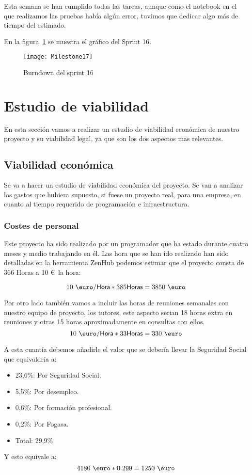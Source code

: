Esta semana se han cumplido todas las tareas, aunque como el notebook en el que realizamos las pruebas había algún error, tuvimos que dedicar algo más de tiempo del estimado.

En la figura~\ref{fig:Milestone17} se muestra el gráfico del Sprint 16.

\begin{figure}
\centering
\texttt{[image: Milestone17]}
\caption{Burndown del sprint 16}
\label{fig:Milestone17}
\end{figure}

\section{Estudio de viabilidad}
En esta sección vamos a realizar un estudio de viabilidad económica de nuestro proyecto y su viabilidad legal, ya que son los dos aspectos mas relevantes.
\subsection{Viabilidad económica}
Se va a hacer un estudio de viabilidad económica del proyecto. Se van a analizar los gastos que hubiera supuesto, si fuese un proyecto real, para una empresa, en cuanto al tiempo requerido de programación e infraestructura.
\subsubsection{Costes de personal}
Este proyecto ha sido realizado por un programador que ha estado durante cuatro meses y medio trabajando en él.
Las hora que se han ido realizado han sido detalladas en la herramienta ZenHub podemos estimar que el proyecto consta de 366 Horas a 10 \euro~la hora:

\[10~{\mbox{\euro}} /\textsf{Hora}*385\textsf{Horas}=3850~{\mbox{\euro}}\]

Por otro lado también vamos a incluir las horas de reuniones semanales con nuestro equipo de proyecto, los tutores, este aspecto serian 18 horas extra en reuniones y otras 15 horas aproximadamente en consultas con ellos.
\[10~{\mbox{\euro}} /\textsf{Hora}*33\textsf{Horas}=330 ~{\mbox{\euro}} \]

A esta cuantía debemos añadirle el valor que se debería llevar la Seguridad Social que equivaldría a:
\begin{itemize}
\item 23,6\%: Por Seguridad Social.
\item 5,5\%: Por desempleo.
\item 0,6\%: Por formación profesional.
\item 0,2\%: Por Fogasa.
\item Total: 29,9\% 
\end{itemize}
Y esto equivale a: 
\[4180~{\mbox{\euro}}*0.299=1250~{\mbox{\euro}}\]

